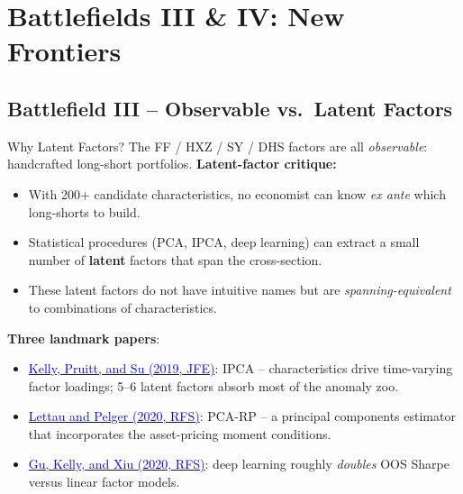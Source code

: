 \documentclass{beamer}
\begin{document}
\section{Battlefields III \& IV: New Frontiers}

\subsection{Battlefield III -- Observable vs.\ Latent Factors}

\begin{frame}{Why Latent Factors?}
	The FF / HXZ / SY / DHS factors are all \textit{observable}: handcrafted long-short portfolios.
	\vspace{4pt}
	\textbf{Latent-factor critique:}
	\begin{itemize}
		\item With 200+ candidate characteristics, no economist can know \textit{ex ante} which long-shorts to build.
		\item Statistical procedures (PCA, IPCA, deep learning) can extract a small number of \textbf{latent} factors that span the cross-section.
		\item These latent factors do not have intuitive names but are \textit{spanning-equivalent} to combinations of characteristics.
	\end{itemize}
	\vspace{4pt}
	\textbf{Three landmark papers}:
	\begin{itemize}
		\item \href{https://doi.org/10.1016/j.jfineco.2019.05.001}{\textcolor{blue}{Kelly, Pruitt, and Su (2019, JFE)}}: IPCA -- characteristics drive time-varying factor loadings; 5--6 latent factors absorb most of the anomaly zoo.
		\item \href{https://doi.org/10.1093/rfs/hhaa020}{\textcolor{blue}{Lettau and Pelger (2020, RFS)}}: PCA-RP -- a principal components estimator that incorporates the asset-pricing moment conditions.
		\item \href{https://doi.org/10.1093/rfs/hhaa009}{\textcolor{blue}{Gu, Kelly, and Xiu (2020, RFS)}}: deep learning roughly \textit{doubles} OOS Sharpe versus linear factor models.
	\end{itemize}
\end{frame}
\end{document}
